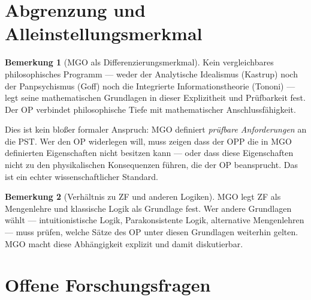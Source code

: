 \documentclass[11pt,a4paper]{article}
\theoremstyle{plain}
\theoremstyle{definition}
\newtheorem{remark}{Bemerkung}[section]
\begin{document}
\section{Abgrenzung und Alleinstellungsmerkmal}

\begin{remark}[MGO als Differenzierungsmerkmal]
Kein vergleichbares philosophisches Programm --- weder der Analytische Idealismus
(Kastrup) noch der Panpsychismus (Goff) noch die Integrierte Informationstheorie
(Tononi) --- legt seine mathematischen Grundlagen in dieser Explizitheit und
Pr\"{u}fbarkeit fest. Der OP verbindet philosophische Tiefe mit mathematischer
Anschlussfähigkeit.

Dies ist kein blo\ss{}er formaler Anspruch: MGO definiert \emph{pr\"{u}fbare
Anforderungen} an die PST. Wer den OP widerlegen will, muss zeigen dass der
OPP die in MGO definierten Eigenschaften nicht besitzen kann --- oder dass diese
Eigenschaften nicht zu den physikalischen Konsequenzen f\"{u}hren, die der OP
beansprucht. Das ist ein echter wissenschaftlicher Standard.
\end{remark}

\begin{remark}[Verh\"{a}ltnis zu ZF und anderen Logiken]
MGO legt ZF als Mengenlehre und klassische Logik als Grundlage fest. Wer andere
Grundlagen w\"{a}hlt --- intuitionistische Logik, Parakonsistente Logik, alternative
Mengenlehren --- muss pr\"{u}fen, welche S\"{a}tze des OP unter diesen Grundlagen
weiterhin gelten. MGO macht diese Abh\"{a}ngigkeit explizit und damit diskutierbar.
\end{remark}

\section{Offene Forschungsfragen}
\end{document}
